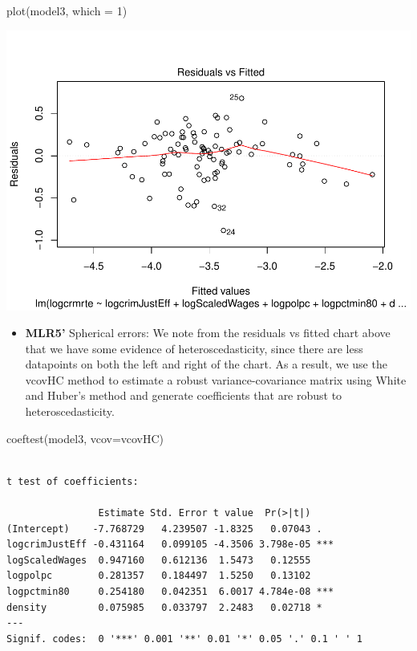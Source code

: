 \documentclass[]{article}
\newenvironment{Shaded}{}{}
\newcommand{\DataTypeTok}[1]{#1}
\newcommand{\DecValTok}[1]{#1}
\newcommand{\KeywordTok}[1]{\textcolor[rgb]{0.00,0.00,1.00}{#1}}
\newcommand{\NormalTok}[1]{#1}
\providecommand{\tightlist}{%
  \setlength{\itemsep}{0pt}\setlength{\parskip}{0pt}}
\begin{document}
\begin{Shaded}
\begin{Highlighting}[]
\KeywordTok{plot}\NormalTok{(model3, }\DataTypeTok{which =} \DecValTok{1}\NormalTok{)}
\end{Highlighting}
\end{Shaded}

\includegraphics{Bagnard_Gaustad_Hartman_Leung_Lab_3_files/figure-latex/unnamed-chunk-85-1.pdf}

\begin{itemize}
\tightlist
\item
  \textbf{MLR5'} Spherical errors: We note from the residuals vs fitted
  chart above that we have some evidence of heteroscedasticity, since
  there are less datapoints on both the left and right of the chart. As
  a result, we use the vcovHC method to estimate a robust
  variance-covariance matrix using White and Huber's method and generate
  coefficients that are robust to heteroscedasticity.
\end{itemize}

\begin{Shaded}
\begin{Highlighting}[]
\KeywordTok{coeftest}\NormalTok{(model3, }\DataTypeTok{vcov=}\NormalTok{vcovHC)}
\end{Highlighting}
\end{Shaded}

\begin{verbatim}

t test of coefficients:

                Estimate Std. Error t value  Pr(>|t|)    
(Intercept)    -7.768729   4.239507 -1.8325   0.07043 .  
logcrimJustEff -0.431164   0.099105 -4.3506 3.798e-05 ***
logScaledWages  0.947160   0.612136  1.5473   0.12555    
logpolpc        0.281357   0.184497  1.5250   0.13102    
logpctmin80     0.254180   0.042351  6.0017 4.784e-08 ***
density         0.075985   0.033797  2.2483   0.02718 *  
---
Signif. codes:  0 '***' 0.001 '**' 0.01 '*' 0.05 '.' 0.1 ' ' 1
\end{verbatim}
\end{document}
